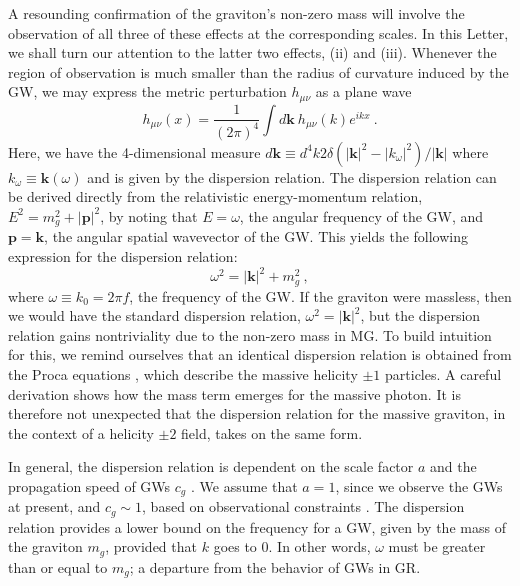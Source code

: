 \documentclass[prd,twocolumn,aps,psfig,nofootinbib,nobibnotes,superscriptaddress,preprintnumbers,times]{revtex4-2}
\begin{document}
A resounding confirmation of the graviton's non-zero mass will involve the observation of all three of these effects at the corresponding scales. In this Letter, we shall turn our attention to the latter two effects, (ii) and (iii). Whenever the region of observation is much smaller than the radius of curvature induced by the GW, we may express the metric perturbation $h_{\mu\nu}$ as a plane wave \cite{Isi:2018miq}
\begin{equation}\label{eqn:planewave}
    h_{\mu\nu}(x) = \frac{1}{(2\pi)^4}\int d\boldsymbol{k} \ h_{\mu\nu}(k) e^{ikx} \ .
\end{equation}
Here, we have the 4-dimensional measure $d\boldsymbol{k} \equiv d^4 k 2\delta(|\boldsymbol{k}|^2 - |k_{\omega}|^2)/|\boldsymbol{k}|$ where $k_{\omega} \equiv \boldsymbol{k}(\omega)$ and is given by the dispersion relation. The dispersion relation can be derived directly from the relativistic energy-momentum relation, $E^2 = m_g^2 + |{\boldsymbol{p}}|^2$, by noting that $E = \omega$, the angular frequency of the GW, and ${\boldsymbol{p}} = \boldsymbol{k}$, the angular spatial wavevector of the GW. This yields the following expression for the dispersion relation: 
\begin{equation}\label{eq:dispersion}
    \omega^2 = |\boldsymbol{k}|^2+ m_g^2 \ ,
\end{equation}
where $\omega \equiv k_0 = 2\pi f$, the frequency of the GW. If the graviton were massless, then we would have the standard dispersion relation, $\omega^2 = |\boldsymbol{k}|^2$, but the dispersion relation gains nontriviality due to the non-zero mass in MG. 
To build intuition for this, we remind ourselves that an identical dispersion relation is obtained from the Proca equations \cite{Proca:1936fbw}, which describe the massive helicity $\pm 1$ particles. A careful derivation shows how the mass term emerges \cite{Wang:2024kir} for the massive photon. It is therefore not unexpected that the dispersion relation for the massive graviton, in the context of a helicity $\pm 2$ field, takes on the same form. 

In general, the dispersion relation is dependent on the scale factor $a$ and the propagation speed of GWs $c_g$ \cite{Gumrukcuoglu:2012wt}. We assume that $a=1$, since we observe the GWs at present, and $c_g \sim  1$, based on observational constraints \cite{LIGOScientific:2017vwq, LIGOScientific:2017zic, LIGOScientific:2017ync}.
The dispersion relation provides a lower bound on the frequency for a GW, given by the mass of the graviton $m_g$, provided that $k$ goes to 0. In other words, $\omega$ must be greater than or equal to $m_g$; a departure from the behavior of GWs in GR.
\end{document}

